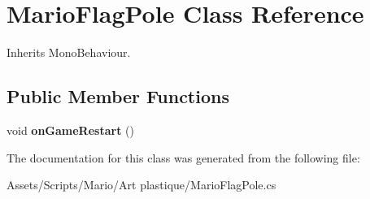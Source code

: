 \hypertarget{class_mario_flag_pole}{\section{Mario\-Flag\-Pole Class Reference}
\label{class_mario_flag_pole}
}


Inherits Mono\-Behaviour.

\subsection*{Public Member Functions}
\begin{DoxyCompactItemize}
\item 
\hypertarget{class_mario_flag_pole_a9655e1a4530fe69f3799004e44b5b674}{void {\bfseries on\-Game\-Restart} ()}\label{class_mario_flag_pole_a9655e1a4530fe69f3799004e44b5b674}

\end{DoxyCompactItemize}


The documentation for this class was generated from the following file\-:\begin{DoxyCompactItemize}
\item 
Assets/\-Scripts/\-Mario/\-Art plastique/Mario\-Flag\-Pole.\-cs\end{DoxyCompactItemize}

